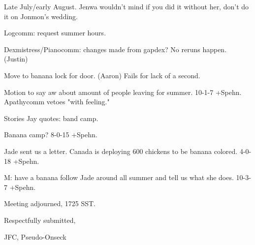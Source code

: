 \documentclass[12pt]{article}
\begin{document}
Late July/early August. Jenwa wouldn't mind if you did it without her, don't do it on Jonmon's wedding.

Logcomm: request summer hours.

Dexmistress/Pianocomm: changes made from gapdex? No reruns happen. (Justin)

Move to banana lock for door. (Aaron) Fails for lack of a second.

Motion to say aw about amount of people leaving for summer. 10-1-7 +Spehn. Apathycomm vetoes "with feeling."

Stories Jay quotes: band camp.

Banana camp? 8-0-15 +Spehn.

Jade sent us a letter. Canada is deploying 600 chickens to be banana colored. 4-0-18 +Spehn.

M: have a banana follow Jade around all summer and tell us what she does. 10-3-7 +Spehn.

\vspace{12pt}

\noindent
Meeting adjourned, 1725 SST.

\vspace{18pt}

\centerline{Respectfully submitted,}
\centerline{JFC, Pseudo-Onseck}
\end{document}
